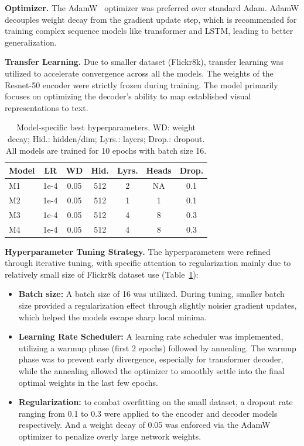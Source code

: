\documentclass[10pt,twocolumn,letterpaper]{article}
\begin{document}
\noindent\textbf{Optimizer.} The AdamW~\cite{loshchilov2019decoupled}
optimizer was preferred over standard Adam. AdamW decouples weight
decay from the gradient update step, which is recommended for
training complex sequence models like transformer and LSTM, leading
to better generalization.

\noindent\textbf{Transfer Learning.} Due to smaller dataset (Flickr8k),
transfer learning was utilized to accelerate convergence across all
the models. The weights of the Resnet-50 encoder were strictly frozen
during training. The model primarily focuses on optimizing the
decoder's ability to map established visual representations to text.

\begin{table}[t]
\begin{center}
\setlength{\tabcolsep}{4pt}
\begin{tabular}{lcccccc}
\toprule
Model & LR & WD & Hid. & Lyrs. & Heads & Drop. \\
\midrule
M1 & 1e-4 & 0.05 & 512 & 2 & NA  & 0.1 \\
M2 & 1e-4 & 0.05 & 512 & 1 & 1   & 0.1 \\
M3 & 1e-4 & 0.05 & 512 & 4 & 8   & 0.3 \\
M4 & 1e-4 & 0.05 & 512 & 4 & 8   & 0.3 \\
\bottomrule
\end{tabular}
\caption{\footnotesize Model-specific best hyperparameters.
WD: weight decay; Hid.: hidden/dim; Lyrs.: layers; Drop.: dropout.
All models are trained for 10 epochs with batch size 16.}
\label{tab:hparams}
\end{center}
\end{table}

\noindent\textbf{Hyperparameter Tuning Strategy.} The hyperparameters were
refined through iterative tuning, with specific attention to
regularization mainly due to relatively small size of Flickr8k
dataset use (Table~\ref{tab:hparams}):
\begin{itemize}
   \setlength\itemsep{0.5em}
    \item \textbf{Batch size:} A batch size of 16 was utilized.
    During tuning, smaller batch size provided a regularization
    effect through slightly noisier gradient updates, which helped
    the models escape sharp local minima.
    \item \textbf{Learning Rate Scheduler:} A learning rate scheduler
    was implemented, utilizing a warmup phase (first 2 epochs)
    followed by annealing. The warmup phase was to prevent early
    divergence, especially for transformer decoder, while the
    annealing allowed the optimizer to smoothly settle into the
    final optimal weights in the last few epochs.
    \item \textbf{Regularization:} to combat overfitting on the
    small dataset, a dropout rate ranging from 0.1 to 0.3 were
    applied to the encoder and decoder models respectively. And a
    weight decay of 0.05 was enforced via the AdamW optimizer to
    penalize overly large network weights.
\end{itemize}
\end{document}

